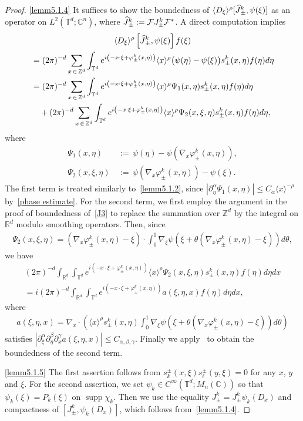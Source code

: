 \documentclass[AHL,Unicode,longabstracts,published]{cedram}
\renewcommand{\a}{\alpha}
\renewcommand{\b}{\beta}
\newcommand{\g}{\gamma}
\newcommand{\f}{\varphi}
\newcommand{\x}{\xi}
\newcommand{\y}{\eta}
\newcommand{\C}{\mathbb{C}}
\newcommand{\R}{\mathbb{R}}
\newcommand{\Z}{\mathbb{Z}}
\newcommand{\T}{\mathbb{T}}
\newcommand{\FS}{\mathcal{F}}
\newcommand{\la}{\langle}
\newcommand{\ra}{\rangle}
\newcommand{\jap}[1]{\langle #1 \rangle}
\DeclareMathOperator{\supp}{supp}
\let\oldhat\hat
\renewcommand*{\hat}[1]{\mathchoice{\widehat{#1}}{\widehat{#1}}{\oldhat{#1}}{\oldhat{#1}}}
\newcommand{\Z}{\mathbb{Z}}
\newcommand{\R}{\mathbb{R}}
\begin{document}
\begin{proof}
\eqref{lemm5.1.4} It suffices to show the boundedness of $\jap{D_\x}^\rho [\hat{J}_\pm^k, \psi(\x)]$ as an operator on $L^2(\T^d;\C^n)$, where $\hat{J}_\pm^k:=\FS J_\pm^k\FS^*$. A direct computation implies
\begin{multline*}
\la D_\x \ra^\rho \left[\hat{J}_\pm^k, \psi(\x)\right]f(\x) \\
\begin{aligned}
&= (2\pi)^{-d} \sum_{x\,\in\,\Z^d}\int_{\T^d} e^{i\left(-x\cdot\x+\f_\pm^k(x,\y)\right)} \jap{x}^\rho \bigl(\psi(\y)-\psi(\x)\bigr) s_\pm^k(x,\y) f(\y) d\y \\
&= (2\pi)^{-d} \sum_{x\,\in\,\Z^d}\int_{\T^d} e^{i\left(-x\cdot\x+\f_\pm^k(x,\y)\right)} \jap{x}^\rho \Psi_1(x,\y) s_\pm^k(x,\y) f(\y) d\y  \\
&\quad + (2\pi)^{-d} \sum_{x\,\in\,\Z^d}\int_{\T^d} e^{i\left(-x\cdot\x+\f_\pm^k(x,\y)\right)} \jap{x}^\rho \Psi_2(x,\x,\y) s_\pm^k(x,\y) f(\y) d\y, 
\end{aligned}
\end{multline*}
where
\begin{align*}
\Psi_1(x,\y)\, &{:=}\,  \psi(\y)-\psi\left(\nabla_x\f_\pm^k(x,\y)\right), \\
\Psi_2(x,\x,\y)\, &{:=}\,  \psi\left(\nabla_x\f_\pm^k(x,\y)\right)-\psi(\x).
\end{align*}
The first term is treated similarly to~\eqref{lemm5.1.2}, since $|\partial_\y^\a \Psi_1(x,\y)| \leq C_\a \jap{x}^{-\rho}$ by~\eqref{phase estimate}. For the second term, we first employ the argument in the proof of boundedness of~\eqref{J3} to replace the summation over $\Z^d$ by the integral on $\R^d$ modulo smoothing operators. Then, since
\begin{align*}
\Psi_2(x,\x,\y) = \left(\nabla_x\f_\pm^k(x,\y)-\x\right)\cdot\int_0^1 \nabla_\x \psi\left(\x+\theta\left(\nabla_x\f_\pm^k(x,\y)-\x\right)\right) d\theta,
\end{align*}
we have
\begin{multline*}
(2\pi)^{-d} \int_{\R^d}\int_{\T^d} e^{i\left(-x\cdot\x+\f_\pm^k(x,\y)\right)} \jap{x}^\rho \Psi_2(x,\x,\y) s_\pm^k(x,\y) f(\eta) d\eta dx \\
= i(2\pi)^{-d} \int_{\R^d}\int_{\T^d} e^{i\left(-x\cdot\x+\f_\pm^k(x,\y)\right)} a(\x,\y,x) f(\y) d\y dx,
\end{multline*}
where
\begin{align*}
a(\x,\y,x)=\nabla_x \cdot \left(\jap{x}^\rho s_\pm^k(x,\y) \int_0^1 \nabla_\x\psi\left(\x+\theta\left(\nabla_x\f_\pm^k(x,\y)-\x\right)\right) d\theta \right)
\end{align*}
satisfies $|\partial_\x^\a\partial_\y^\b\partial_x^\g a(\x,\y,x)|\leq C_{\a,\b,\g}$. Finally we apply~\cite[Theorem~2.1]{As-F} to obtain the boundedness of the second term.

\eqref{lemm5.1.5} The first assertion follows from $s_k^\pm(x,\x)s_\ell^\pm(y,\x)=0$ for any $x$, $y$ and $\x$. For the second assertion, we set $\psi_k\in C^\infty(\T^d;M_n(\C))$ so that $\psi_k(\x)=P_k(\x)$ on $\supp \chi_k$. Then we use the equality $J_\pm^k=J_\pm^k \psi_k(D_x)$ and compactness of $[J_\pm^k,\psi_k(D_x)]$, which follows from~\eqref{lemm5.1.4}.
\end{proof}
\end{document}
